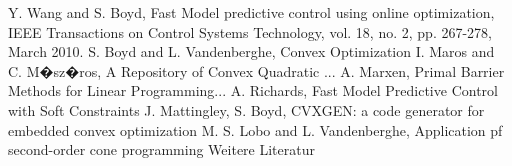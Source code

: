 \documentclass[letterpaper, 10 pt, conference]{ieeeconf}  %
\begin{document}
\begin{thebibliography}{99}

 Y. Wang and S. Boyd, Fast Model predictive control using online optimization, IEEE Transactions on Control Systems Technology, vol. 18, no. 2, pp. 267-278, March 2010.
 S. Boyd and L. Vandenberghe, Convex Optimization
 I. Maros and C. M�sz�ros, A Repository of Convex Quadratic ...
 A. Marxen, Primal Barrier Methods for Linear Programming...
 A. Richards, Fast Model Predictive Control with Soft Constraints
 J. Mattingley, S. Boyd, CVXGEN: a code generator for embedded convex optimization
 M. S. Lobo and L. Vandenberghe, Application pf second-order cone programming
 Weitere Literatur

\end{thebibliography}
\end{document}
